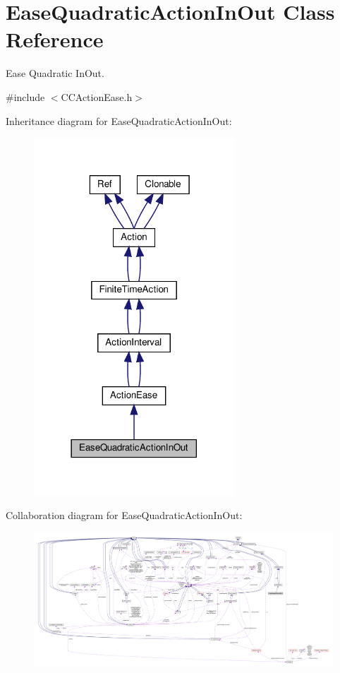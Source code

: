 \hypertarget{classEaseQuadraticActionInOut}{}\section{Ease\+Quadratic\+Action\+In\+Out Class Reference}
\label{classEaseQuadraticActionInOut}


Ease Quadratic In\+Out.  




{\ttfamily \#include $<$C\+C\+Action\+Ease.\+h$>$}



Inheritance diagram for Ease\+Quadratic\+Action\+In\+Out\+:
\nopagebreak
\begin{figure}[H]
\begin{center}
\leavevmode
\includegraphics[width=213pt]{classEaseQuadraticActionInOut__inherit__graph}
\end{center}
\end{figure}


Collaboration diagram for Ease\+Quadratic\+Action\+In\+Out\+:
\nopagebreak
\begin{figure}[H]
\begin{center}
\leavevmode
\includegraphics[width=350pt]{classEaseQuadraticActionInOut__coll__graph}
\end{center}
\end{figure}

